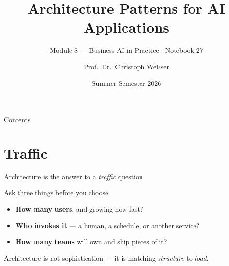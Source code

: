 \documentclass[aspectratio=169,11pt]{beamer}
\title{Architecture Patterns for AI Applications}
\subtitle{Module 8 --- Business AI in Practice $\cdot$ Notebook 27}
\author{Prof.\ Dr.\ Christoph Weisser}
\institute{HSBI}
\date{Summer Semester 2026}
\begin{document}
\begin{frame}\titlepage\end{frame}

\begin{frame}{Contents}
  \tableofcontents[hideallsubsections]
\end{frame}

\section{Traffic}
\begin{frame}{Architecture is the answer to a \emph{traffic} question}
  \begin{center}
  \end{center}
  \begin{block}{Ask three things before you choose}
    \begin{itemize}
      \item \textbf{How many users}, and growing how fast?
      \item \textbf{Who invokes it} --- a human, a schedule, or another service?
      \item \textbf{How many teams} will own and ship pieces of it?
    \end{itemize}
  \end{block}
  {\footnotesize Architecture is not sophistication --- it is matching \emph{structure} to \emph{load}.}
\end{frame}

\end{document}
